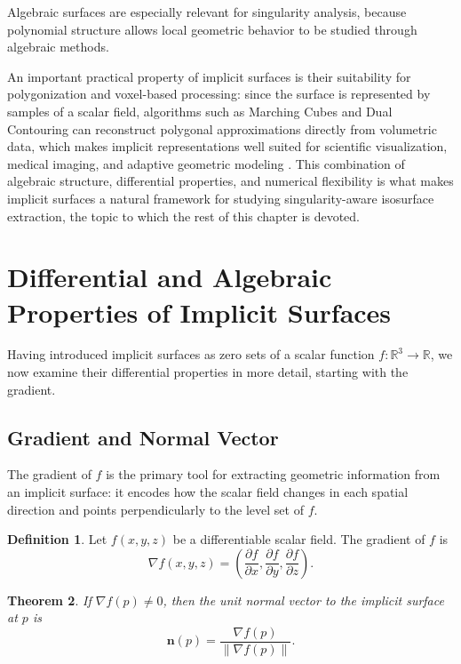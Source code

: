 \documentclass[12pt, a4paper, oneside]{book}
\theoremstyle{plain}
\newtheorem{theorem}{Theorem}[chapter]
\theoremstyle{definition}
\newtheorem{definition}[theorem]{Definition}
\theoremstyle{remark}
\theoremstyle{definition}
\begin{document}
Algebraic surfaces are especially relevant for singularity analysis, because polynomial
structure allows local geometric behavior to be studied through algebraic methods.

An important practical property of implicit surfaces is their suitability for
polygonization and voxel-based processing: since the surface is represented by samples
of a scalar field, algorithms such as Marching Cubes and Dual Contouring can reconstruct
polygonal approximations directly from volumetric data, which makes implicit
representations well suited for scientific visualization, medical imaging, and adaptive
geometric modeling \cite{bloomenthal2000implicit}. This combination of algebraic
structure, differential properties, and numerical flexibility is what makes implicit
surfaces a natural framework for studying singularity-aware isosurface extraction, the
topic to which the rest of this chapter is devoted.

\section{Differential and Algebraic Properties of Implicit Surfaces}

Having introduced implicit surfaces as zero sets of a scalar function
$f:\mathbb{R}^3 \rightarrow \mathbb{R}$, we now examine their differential properties in
more detail, starting with the gradient.

\subsection{Gradient and Normal Vector}

The gradient of $f$ is the primary tool for extracting geometric information from an
implicit surface: it encodes how the scalar field changes in each spatial direction and
points perpendicularly to the level set of $f$.

\begin{definition}%
Let $f(x,y,z)$ be a differentiable scalar field. The gradient of $f$ is
\[
\nabla f(x,y,z) = \left(\frac{\partial f}{\partial x}, \frac{\partial f}{\partial y},
\frac{\partial f}{\partial z}\right).
\]
\end{definition}

\begin{theorem}%
If $\nabla f(p) \neq 0$, then the unit normal vector to the implicit surface at $p$ is
\[
\mathbf{n}(p) = \frac{\nabla f(p)}{\|\nabla f(p)\|}.
\]
\end{theorem}
\end{document}
